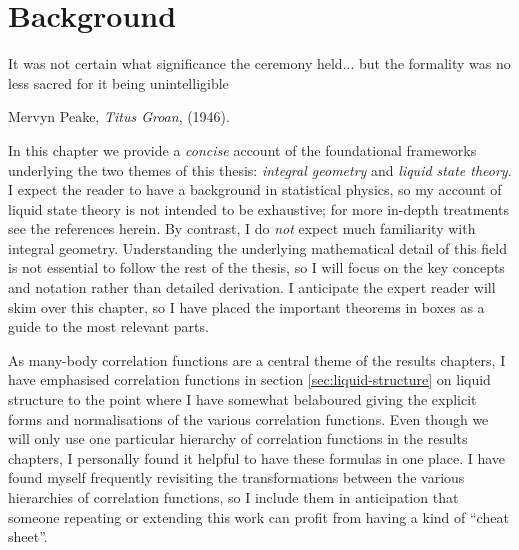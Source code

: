 \documentclass[11pt,twoside]{report}
\def\includebibliography{}
\begin{document}
\chapter{Background}
\epigraph{It was not certain what significance the ceremony held... but the formality was no less sacred for it being unintelligible}{Mervyn Peake, \emph{Titus Groan}, (1946).}

In this chapter we provide a \emph{concise} account of the foundational frameworks underlying the two themes of this thesis: \emph{integral geometry} and \emph{liquid state theory}.
I expect the reader to have a background in statistical physics, so my account of liquid state theory is not intended to be exhaustive; for more in-depth treatments see the references herein.
By contrast, I do \emph{not} expect much familiarity with integral geometry.
Understanding the underlying mathematical detail of this field is not essential to follow the rest of the thesis, so I will focus on the key concepts and notation rather than detailed derivation.
I anticipate the expert reader will skim over this chapter, so I have placed the important theorems in boxes as a guide to the most relevant parts.

As many-body correlation functions are a central theme of the results chapters, I have emphasised correlation functions in section \ref{sec:liquid-structure} on liquid structure to the point where I have somewhat belaboured giving the explicit forms and normalisations of the various correlation functions.
Even though we will only use one particular hierarchy of correlation functions in the results chapters, I personally found it helpful to have these formulas in one place.
I have found myself frequently revisiting the transformations between the various hierarchies of correlation functions, so I include them in anticipation that someone repeating or extending this work can profit from having a kind of ``cheat sheet''.






\ifdefined\includebibliography
  \printbibliography
\fi
\end{document}
